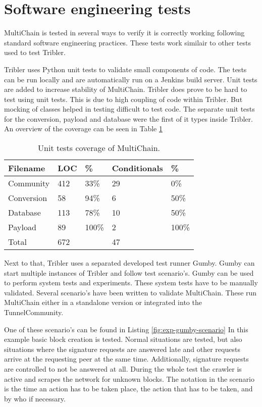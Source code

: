 \section{Software engineering tests}
MultiChain is tested in several ways to verify it is correctly working
following standard software engineering practices.
These tests work similair to other tests used to test Tribler.

Tribler uses Python unit tests  to validate small components of code.
The tests can be run locally and
are automatically run on a Jenkins build server\cite{jenkins}\cite{jenkins-tribler}.
Unit tests are added to increase stability of MultiChain.
Tribler does prove to be hard to test using unit tests.
This is due to high coupling of code within Tribler.
But mocking of classes helped in testing difficult to test code.
The separate unit tests for the conversion, payload and database were the first of it types inside Tribler.
An overview of the coverage can be seen in Table \ref{tab:tests}

\begin{table}
\centering
\begin{tabular}{l|ll|ll}
Filename   & LOC & \%    & Conditionals & \%    \\ \hline
Community  & 412 & 33\%  & 29           & 0\%   \\
Conversion & 58  & 94\%  & 6            & 50\%  \\
Database   & 113 & 78\%  & 10           & 50\%  \\
Payload    & 89  & 100\% & 2            & 100\% \\ \hline
Total      & 672 &       & 47           &
\end{tabular}
\caption{Unit tests coverage of MultiChain.}
\label{tab:tests}
\end{table}

Next to that, Tribler uses a separated developed test runner Gumby.
Gumby can start multiple instances of Tribler and follow test scenario's.
Gumby can be used to perform system tests and experiments.
These system tests have to be manually validated.
Several scenario's have been written to validate MultiChain.
These run MultiChain either in a standalone version or integrated into the TunnelCommunity.

One of these scenario's can be found in Listing \ref{fig:exp-gumby-scenario}
In this example basic block creation is tested.
Normal situations are tested,
but also situations where the signature requests are answered late
and other requests arrive at the requesting peer at the same time.
Additionally, signature requests are controlled to not be answered at all.
During the whole test the crawler is active and scrapes the network for unknown blocks.
The notation in the scenario is the time an action has to be taken place,
the action that has to be taken, and by who if necessary.

